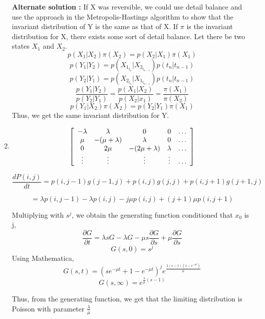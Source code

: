 \documentclass[a4paper,11pt]{article}
\newenvironment{mat}{\left[ \begin{array}{ccccccccccccc}}{\end{array}\right]}
\newcommand\bcm{\begin{mat}}
\newcommand\ecm{\end{mat}}
\begin{document}
\begin{enumerate}
\textbf{Alternate solution : }
If X was reversible, we could use detail balance and use the approach in the Metropolis-Hastings algorithm to show that the invariant distribution of Y is the same as that of X. 
If $\pi$ is the invariant distribution for X, there exists some sort of detail balance. Let there be two states $X_1$ and $X_2$.
\[p(X_1|X_2)\pi(X_2) = p(X_2|X_1)\pi(X_1) \]
\[p(Y_1|Y_2) = p(X_{1_{t_n}}|X_{2_{t_{n-1}}})p(t_n|t_{n-1})\]
\[p(Y_2|Y_1) = p(X_{2_{t_n}}|X_{1_{t_{n-1}}})p(t_n|t_{n-1})\]
\[\frac{p(Y_1|Y_2)}{p(Y_2|Y_1)} =\frac{p(X_1|X_2)}{p(X_2|x_1)}= \frac{\pi(X_1)}{\pi(X_2)}\]
\[p(Y_1|X_2)\pi(X_2) = p(Y_2|Y_1)\pi(X_1) \]
Thus, we get the same invariant distribution for Y.


\item
\[\bcm -\lambda &\lambda &0 &0 &\hdots \\ \mu &-(\mu+\lambda) &\lambda  &0 &\hdots \\0 &2\mu &-(2\mu+\lambda) &\lambda   &\hdots\\ \vdots &\vdots&\vdots  &\vdots &\hdots \ecm\]

\[\frac{dP(i,j)}{dt} = p(i,j-1)g(j-1,j) +p(i,j)g(j,j)+p(i,j+1)g(j+1,j)\]

\[= \lambda p(i,j-1) -\lambda p(i,j)-j \mu p(i,j)+(j+1)\mu p(i,j+1)\]

Multiplying with $s^j$, we obtain the generating function conditioned that $x_0$ is  j,
\[\frac{\partial G}{\partial t}=\lambda s G - \lambda G - \mu s\frac{\partial G}{\partial s} + \mu \frac{\partial G}{\partial s}\]
\[G(s,0)= s^j\]
Using Mathematica,
\[G(s,t) = (se^{-\mu t}+1-e^{-\mu t})^je^{\frac{\lambda (s-1) (1-e^{-\mu t})}{\mu}}\]
\[G (s,\infty) = e^{\frac{\lambda}{\mu} (s-1) }\]

Thus, from the generating function, we get that the limiting distribution is Poisson with parameter $\frac{\lambda}{\mu}$


\end{enumerate}
\end{document}
